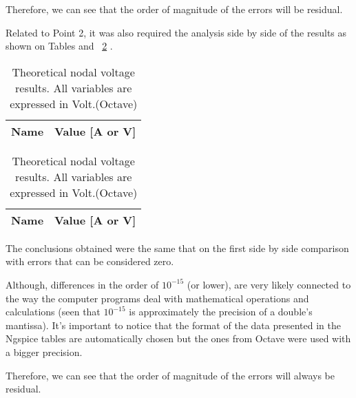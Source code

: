 Therefore, we can see that the order of magnitude of the errors will be residual.

Related to Point 2, it was also required the analysis side by side of the results as shown on Tables and ~\ref{tab:final2} . 

\begin{table}[ht]
\parbox{.45\linewidth}{
  \centering
  \begin{tabular}{|l|r|}
    \hline    
    {\bf Name} & {\bf Value [A or V]} \\ \hline
    
 
  \end{tabular}
  \caption{Simulation nodal voltage results. All variables are expressed in Volt or Ampere. (Ngspice)}} 
\parbox{.45\linewidth}{
  \centering
  \begin{tabular}{|l|r|}
    \hline    
    {\bf Name} & {\bf Value [A or V]} \\ \hline
    
    
  \end{tabular}
  \caption{Theoretical nodal voltage results. All variables are expressed in Volt.(Octave)}}
\label{tab:final2} 
\end{table}

The conclusions obtained were the same that on the first side by side comparison with errors that can be considered zero.

Although, differences in the order of $10^{-15}$ (or lower), are very likely connected to the way the computer programs deal with mathematical operations and calculations (seen that $10^{-15}$ is approximately the precision of a double's mantissa). It's important to notice that the format of the data presented in the Ngspice tables are automatically chosen but the ones from Octave were used with a bigger precision.

Therefore, we can see that the order of magnitude of the errors will always be residual.




